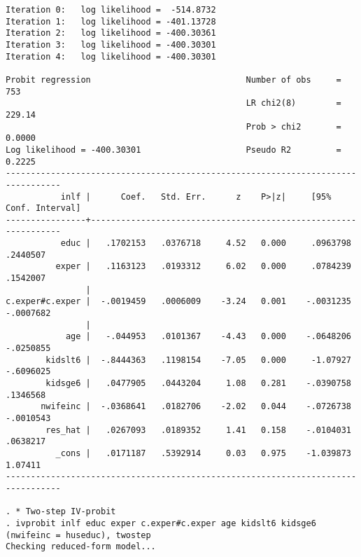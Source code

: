 \begin{verbatim}
Iteration 0:   log likelihood =  -514.8732  
Iteration 1:   log likelihood = -401.13728  
Iteration 2:   log likelihood = -400.30361  
Iteration 3:   log likelihood = -400.30301  
Iteration 4:   log likelihood = -400.30301  

Probit regression                               Number of obs     =        753
                                                LR chi2(8)        =     229.14
                                                Prob > chi2       =     0.0000
Log likelihood = -400.30301                     Pseudo R2         =     0.2225
---------------------------------------------------------------------------------
           inlf |      Coef.   Std. Err.      z    P>|z|     [95% Conf. Interval]
----------------+----------------------------------------------------------------
           educ |   .1702153   .0376718     4.52   0.000     .0963798    .2440507
          exper |   .1163123   .0193312     6.02   0.000     .0784239    .1542007
                |
c.exper#c.exper |  -.0019459   .0006009    -3.24   0.001    -.0031235   -.0007682
                |
            age |   -.044953   .0101367    -4.43   0.000    -.0648206   -.0250855
        kidslt6 |  -.8444363   .1198154    -7.05   0.000     -1.07927   -.6096025
        kidsge6 |   .0477905   .0443204     1.08   0.281    -.0390758    .1346568
       nwifeinc |  -.0368641   .0182706    -2.02   0.044    -.0726738   -.0010543
        res_hat |   .0267093   .0189352     1.41   0.158    -.0104031    .0638217
          _cons |   .0171187   .5392914     0.03   0.975    -1.039873     1.07411
---------------------------------------------------------------------------------

. * Two-step IV-probit
. ivprobit inlf educ exper c.exper#c.exper age kidslt6 kidsge6 (nwifeinc = huseduc), twostep
Checking reduced-form model...


\end{verbatim}
